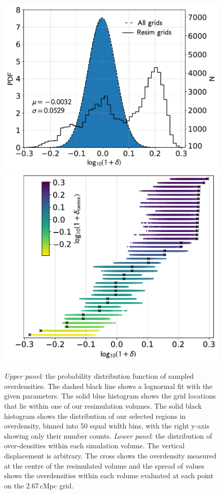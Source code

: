 \begin{figure}
  \includegraphics[width=\columnwidth]{images/sampling_bins.pdf}
  \hspace*{0.15cm}\includegraphics[width=0.85\columnwidth]{images/cum_delta.pdf}
  \caption{\textit{Upper panel}: the probability distribution function of sampled overdensities.
	The dashed black line shows a lognormal fit with the given parameters.
	The solid blue histogram shows the grid locations that lie within one of our resimulation volumes.
	The solid black histogram shows the distribution of our selected regions in overdensity, binned into 50 equal width bins, with the right y-axis showing only their number counts.
	\textit{Lower panel}: the distribution of over-densities within each simulation volume. The vertical displacement is arbitrary.  The cross shows the overdensity measured at the centre of the resimulated volume and the spread of values shows the overdensities within each volume evaluated at each point on the 2.67\,cMpc grid.}
  \label{fig:log_fit}
\end{figure}

